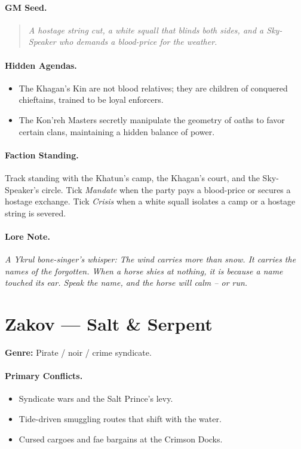 \paragraph{GM Seed.}
\begin{quote}
\emph{A hostage string cut, a white squall that blinds both sides, and a Sky-Speaker who demands a blood-price for the weather.}
\end{quote}

\paragraph{Hidden Agendas.}
\begin{itemize}
  \item The Khagan's Kin are not blood relatives; they are children of conquered chieftains, trained to be loyal enforcers.
  \item The Kon'reh Masters secretly manipulate the geometry of oaths to favor certain clans, maintaining a hidden balance of power.
\end{itemize}

\paragraph{Faction Standing.}
Track standing with the Khatun's camp, the Khagan's court, and the Sky-Speaker's circle. Tick \textit{Mandate} when the party pays a blood-price or secures a hostage exchange. Tick \textit{Crisis} when a white squall isolates a camp or a hostage string is severed.

\paragraph{Lore Note.}
\emph{A Ykrul bone-singer's whisper: \textquotedbl The wind carries more than snow. It carries the names of the forgotten. When a horse shies at nothing, it is because a name touched its ear. Speak the name, and the horse will calm -- or run.\textquotedbl}

\section{Zakov --- \textquotedbl Salt \& Serpent\textquotedbl}
\textbf{Genre:} Pirate / noir / crime syndicate.

\paragraph{Primary Conflicts.}
\begin{itemize}
  \item Syndicate wars and the Salt Prince's levy.
  \item Tide-driven smuggling routes that shift with the water.
  \item Cursed cargoes and fae bargains at the Crimson Docks.
\end{itemize}

